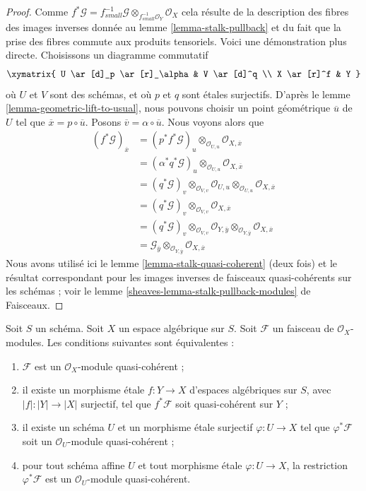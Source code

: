 \begin{proof}
Comme $f^*\mathcal{G} =
f_{small}^{-1}\mathcal{G} \otimes_{f_{small}^{-1}\mathcal{O}_Y} \mathcal{O}_X$
cela résulte de la description des fibres des images inverses donnée au
lemme \ref{lemma-stalk-pullback}
et du fait que la prise des fibres commute aux produits tensoriels.
Voici une démonstration plus directe.
Choisissons un diagramme commutatif
$$
\xymatrix{
U \ar[d]_p \ar[r]_\alpha  & V \ar[d]^q \\
X \ar[r]^f & Y
}
$$
où $U$ et $V$ sont des schémas, et où $p$ et $q$ sont \'etales surjectifs.
D'après le
lemme \ref{lemma-geometric-lift-to-usual},
nous pouvons choisir un point géométrique $\overline{u}$ de $U$ tel que
$\overline{x} = p \circ \overline{u}$. Posons
$\overline{v} = \alpha \circ \overline{u}$.
Nous voyons alors que
\begin{align*}
(f^*\mathcal{G})_{\overline{x}} & =
(p^*f^*\mathcal{G})_u \otimes_{\mathcal{O}_{U, u}}
\mathcal{O}_{X, \overline{x}} \\
& = (\alpha^*q^*\mathcal{G})_u \otimes_{\mathcal{O}_{U, u}}
\mathcal{O}_{X, \overline{x}} \\
& = (q^*\mathcal{G})_v \otimes_{\mathcal{O}_{V, v}}
\mathcal{O}_{U, u} \otimes_{\mathcal{O}_{U, u}}
\mathcal{O}_{X, \overline{x}} \\
& = (q^*\mathcal{G})_v \otimes_{\mathcal{O}_{V, v}}
\mathcal{O}_{X, \overline{x}} \\
& = (q^*\mathcal{G})_v \otimes_{\mathcal{O}_{V, v}}
\mathcal{O}_{Y, \overline{y}} \otimes_{\mathcal{O}_{Y, \overline{y}}}
\mathcal{O}_{X, \overline{x}} \\
& = \mathcal{G}_{\overline{y}} \otimes_{\mathcal{O}_{Y, \overline{y}}}
\mathcal{O}_{X, \overline{x}}
\end{align*}
Nous avons utilisé ici
le lemme \ref{lemma-stalk-quasi-coherent} (deux fois)
et le résultat correspondant pour les images inverses de faisceaux quasi-cohérents
sur les schémas ; voir le
lemme \ref{sheaves-lemma-stalk-pullback-modules} de Faisceaux.
\end{proof}

\begin{lemma}
\label{lemma-characterize-quasi-coherent}
Soit $S$ un schéma. Soit $X$ un espace algébrique sur $S$.
Soit $\mathcal{F}$ un faisceau de $\mathcal{O}_X$-modules.
Les conditions suivantes sont équivalentes :
\begin{enumerate}
\item $\mathcal{F}$ est un $\mathcal{O}_X$-module quasi-cohérent ;
\item il existe un morphisme \'etale $f : Y \to X$
d'espaces algébriques sur $S$, avec $|f| : |Y| \to |X|$ surjectif,
tel que $f^*\mathcal{F}$ soit quasi-cohérent sur $Y$ ;
\item il existe un schéma $U$ et un morphisme \'etale surjectif
$\varphi : U \to X$ tel que $\varphi^*\mathcal{F}$ soit un
$\mathcal{O}_U$-module quasi-cohérent ;
\item pour tout schéma affine $U$ et tout morphisme \'etale $\varphi : U \to X$, la
restriction $\varphi^*\mathcal{F}$ est un $\mathcal{O}_U$-module quasi-cohérent.
\end{enumerate}
\end{lemma}


